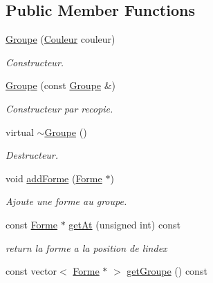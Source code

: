 \subsection*{Public Member Functions}
\begin{DoxyCompactItemize}
\item 
\mbox{\hyperlink{class_groupe_adb2191a0bf07c68fd86f0ee36b4cec8d}{Groupe}} (\mbox{\hyperlink{class_couleur}{Couleur}} couleur)
\begin{DoxyCompactList}\small\item\em Constructeur. \end{DoxyCompactList}\item 
\mbox{\hyperlink{class_groupe_adf726dba5919371e203f34441215ef2d}{Groupe}} (const \mbox{\hyperlink{class_groupe}{Groupe}} \&)
\begin{DoxyCompactList}\small\item\em Constructeur par recopie. \end{DoxyCompactList}\item 
\mbox{\label{class_groupe_a99dd414922635dcc0585aabb2a330f63}} 
virtual \mbox{\hyperlink{class_groupe_a99dd414922635dcc0585aabb2a330f63}{$\sim$\+Groupe}} ()
\begin{DoxyCompactList}\small\item\em Destructeur. \end{DoxyCompactList}\item 
void \mbox{\hyperlink{class_groupe_ac677843fff8abf6c432295c84b91462d}{add\+Forme}} (\mbox{\hyperlink{class_forme}{Forme}} $\ast$)
\begin{DoxyCompactList}\small\item\em Ajoute une forme au groupe. \end{DoxyCompactList}\item 
const \mbox{\hyperlink{class_forme}{Forme}} $\ast$ \mbox{\hyperlink{class_groupe_a6b775538d63e633ea835bdbaa2afd233}{get\+At}} (unsigned int) const
\begin{DoxyCompactList}\small\item\em return la forme a la position de l\textquotesingle{}index \end{DoxyCompactList}\item 
\mbox{\label{class_groupe_ac3ba5def3d119ccc77237c96c0d35cb8}} 
const vector$<$ \mbox{\hyperlink{class_forme}{Forme}} $\ast$ $>$ \mbox{\hyperlink{class_groupe_ac3ba5def3d119ccc77237c96c0d35cb8}{get\+Groupe}} () const

\end{DoxyCompactItemize}
